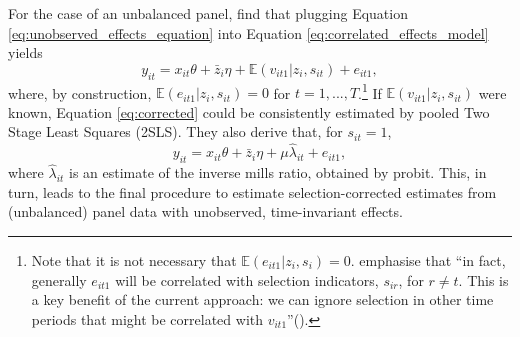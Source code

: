 \documentclass[a4paper,12pt]{article}
\theoremstyle{plain}
\theoremstyle{definition}
\theoremstyle{definition}
\theoremstyle{definition}
\theoremstyle{definition}
\begin{document}
For the case of an unbalanced panel, \citet{semykina2010} find that plugging Equation \ref{eq:unobserved_effects_equation} into Equation \ref{eq:correlated_effects_model} yields
\begin{equation}
    \label{eq:corrected}
    y_{it}=x_{it}\theta + \bar{z}_i \eta + \mathbb{E}(v_{it1}|z_i, s_{it}) + e_{it1},
\end{equation}
where, by construction, $\mathbb{E}(e_{it1}|z_i, s_{it})=0$ for $t=1,...,T$.\footnote{Note that it is not necessary that $\mathbb{E}(e_{it1}|z_i, s_i) = 0$. \citeauthor{semykina2010} emphasise that ``in fact, generally $e_{it1}$ will be correlated with selection indicators, $s_{ir}$, for $r \neq t$. This is a key benefit of the current approach: we can ignore selection in other time periods that might be correlated with $v_{it1}$''(\citeyear[][p. 380]{semykina2010}).} If $\mathbb{E}(v_{it1}|z_i, s_{it})$ were known, Equation \ref{eq:corrected} could be consistently estimated by pooled Two Stage Least Squares (2SLS). They also derive that, for $s_{it}=1$,
\begin{equation}
    \label{eq:WS10_main_equation}
    y_{it}=x_{it}\theta + \bar{z}_i \eta + \mu \hat{\lambda}_{it} + e_{it1},
\end{equation}
where $\hat{\lambda}_{it}$ is an estimate of the inverse mills ratio, obtained by probit. This, in turn, leads to the final procedure to estimate selection-corrected estimates from (unbalanced) panel data with unobserved, time-invariant effects.
\end{document}
